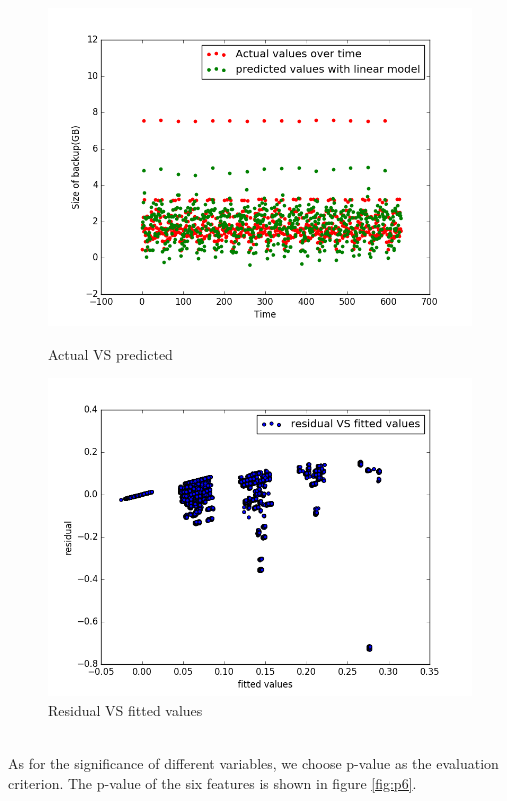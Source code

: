 \documentclass{article}
\begin{document}
\begin{figure}[htbp]
\centering
\begin{minipage}[t]{0.45\textwidth}
\centering
\includegraphics[width=\textwidth]{actual_pred.png}
\caption{Actual VS predicted}
\label{fig:actual_pred}
\end{minipage}
\begin{minipage}[t]{0.45\textwidth}
\centering
\includegraphics[width=\textwidth]{residual.png}
\caption{Residual VS fitted values}
\end{minipage}
\label{fig:residual}
\end{figure}
\\
As for the significance of different variables, we choose p-value as the evaluation criterion. The p-value of the six features is shown in figure \ref{fig:p6}.\\
\end{document}
